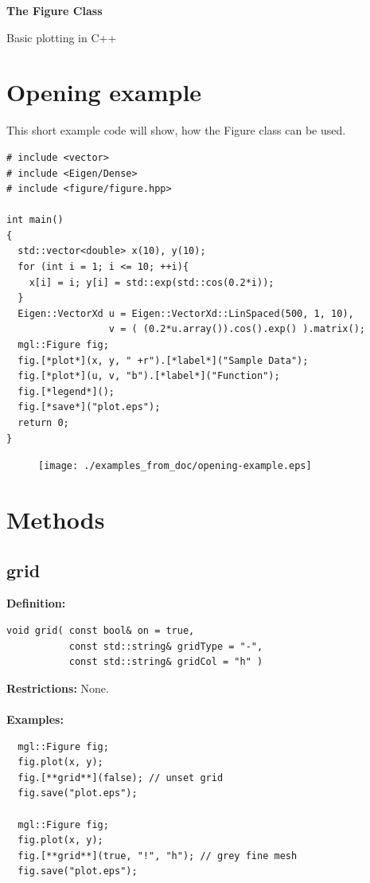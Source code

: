 \documentclass[a4paper]{article}
\newcommand{\command}[1]{\subsection{#1}}
\begin{document}
\begin{center}
  \begin{huge}
    \textbf{The Figure Class\\}
  \end{huge}
  Basic plotting in C++
\end{center}
  
\vspace*{3cm}
  \tableofcontents
\vspace*{\fill}


\section{Opening example}

This short example code will show, how the Figure class can be used.
\begin{lstlisting}
# include <vector>
# include <Eigen/Dense>
# include <figure/figure.hpp>

int main()
{
  std::vector<double> x(10), y(10);
  for (int i = 1; i <= 10; ++i){ 
    x[i] = i; y[i] = std::exp(std::cos(0.2*i));
  }
  Eigen::VectorXd u = Eigen::VectorXd::LinSpaced(500, 1, 10),
                  v = ( (0.2*u.array()).cos().exp() ).matrix();
  mgl::Figure fig;
  fig.[*plot*](x, y, " +r").[*label*]("Sample Data");
  fig.[*plot*](u, v, "b").[*label*]("Function");
  fig.[*legend*]();
  fig.[*save*]("plot.eps");
  return 0;
}
\end{lstlisting}

\begin{figure}[h]
  \centering
  \texttt{[image: ./examples\_from\_doc/opening-example.eps]}
  \thispagestyle{empty}
\end{figure}

\restoregeometry
\section{Methods}

\command{grid}

\textbf{Definition:}
\begin{lstlisting}
void grid( const bool& on = true, 
           const std::string& gridType = "-", 
           const std::string& gridCol = "h" )
\end{lstlisting}
%
\textbf{Restrictions:} None. \\ \\
%
\textbf{Examples:}
\begin{lstlisting}
  mgl::Figure fig;
  fig.plot(x, y);
  fig.[**grid**](false); // unset grid
  fig.save("plot.eps");

  mgl::Figure fig;
  fig.plot(x, y);
  fig.[**grid**](true, "!", "h"); // grey fine mesh
  fig.save("plot.eps");
\end{lstlisting}
\end{document}
